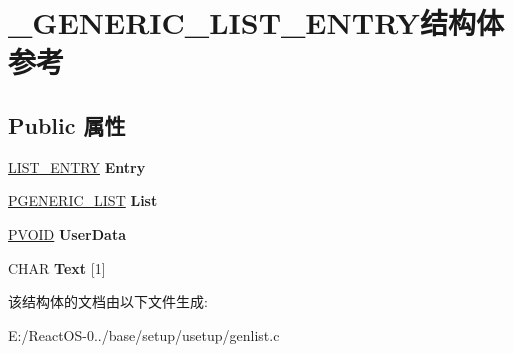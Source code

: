 \hypertarget{struct___g_e_n_e_r_i_c___l_i_s_t___e_n_t_r_y}{}\section{\+\_\+\+G\+E\+N\+E\+R\+I\+C\+\_\+\+L\+I\+S\+T\+\_\+\+E\+N\+T\+R\+Y结构体 参考}
\label{struct___g_e_n_e_r_i_c___l_i_s_t___e_n_t_r_y}
\subsection*{Public 属性}
\begin{DoxyCompactItemize}
\item 
\mbox{\label{struct___g_e_n_e_r_i_c___l_i_s_t___e_n_t_r_y_a8bb750d6dcc807a4f4b041c3941ac464}} 
\hyperlink{struct___l_i_s_t___e_n_t_r_y}{L\+I\+S\+T\+\_\+\+E\+N\+T\+RY} {\bfseries Entry}
\item 
\mbox{\label{struct___g_e_n_e_r_i_c___l_i_s_t___e_n_t_r_y_a44486f025dbbed628384389306e8bc70}} 
\hyperlink{struct___g_e_n_e_r_i_c___l_i_s_t}{P\+G\+E\+N\+E\+R\+I\+C\+\_\+\+L\+I\+ST} {\bfseries List}
\item 
\mbox{\label{struct___g_e_n_e_r_i_c___l_i_s_t___e_n_t_r_y_a0e72cb9883f0177a31574a4d8124447a}} 
\hyperlink{interfacevoid}{P\+V\+O\+ID} {\bfseries User\+Data}
\item 
\mbox{\label{struct___g_e_n_e_r_i_c___l_i_s_t___e_n_t_r_y_a5bcaddd173af1aa636969aaba2717762}} 
C\+H\+AR {\bfseries Text} \mbox{[}1\mbox{]}
\end{DoxyCompactItemize}


该结构体的文档由以下文件生成\+:\begin{DoxyCompactItemize}
\item 
E\+:/\+React\+O\+S-\/0../base/setup/usetup/genlist.\+c\end{DoxyCompactItemize}
